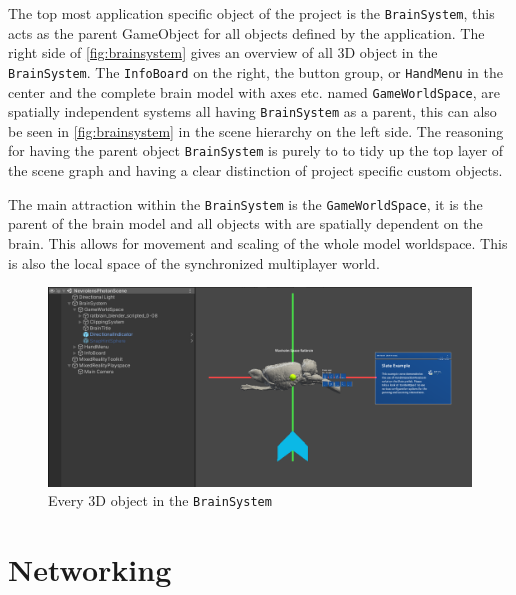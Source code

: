 The top most application specific object of the project is the \texttt{BrainSystem}, this acts as the parent GameObject for all objects defined by the application. The right side of \autoref{fig:brainsystem} gives an overview of all 3D object in the \texttt{BrainSystem}. The \texttt{InfoBoard} on the right, the button group, or \texttt{HandMenu} in the center and the complete brain model with axes etc. named \texttt{GameWorldSpace}, are spatially independent systems all having \texttt{BrainSystem} as a parent, this can also be seen in \autoref{fig:brainsystem} in the scene hierarchy on the left side. The reasoning for having the parent object \texttt{BrainSystem} is purely to to tidy up the top layer of the scene graph and having a clear distinction of project specific custom objects. 

The main attraction within the \texttt{BrainSystem} is the \texttt{GameWorldSpace}, it is the parent of the brain model and all objects with are spatially dependent on the brain. This allows for movement and scaling of the whole model worldspace. This is also the local space of the synchronized multiplayer world. 


\begin{figure}[ht]
    \centering
    \includegraphics[width=\textwidth]{fig/brainsystemoverview5.png}
    \caption{Every 3D object in the \texttt{BrainSystem}}
    \label{fig:brainsystem}
\end{figure}

\section{Networking}

